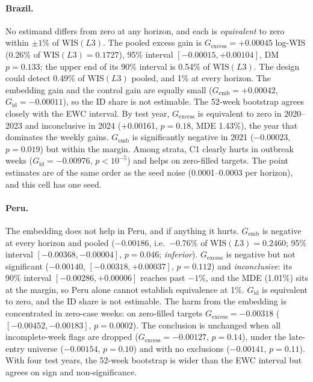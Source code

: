 \documentclass[11pt]{article}
\newcommand{\WIS}{\mathrm{WIS}}
\newcommand{\Gemb}{G_{\mathrm{emb}}}
\newcommand{\Gid}{G_{\mathrm{id}}}
\newcommand{\Gex}{G_{\mathrm{excess}}}
\begin{document}
\paragraph{Brazil.}
No estimand differs from zero at any horizon, and each is \emph{equivalent} to zero within $\pm1\%$ of
$\WIS(L3)$. The pooled excess gain is $\Gex=+0.00045$ log-WIS (0.26\% of $\WIS(L3)=0.1727$), 95\%
interval $[-0.00015, +0.00104]$, DM $p=0.133$; the upper end of its 90\% interval is 0.54\% of
$\WIS(L3)$. The design could detect 0.49\% of $\WIS(L3)$ pooled, and 1\% at every horizon. The embedding
gain and the control gain are equally small ($\Gemb=+0.00042$, $\Gid=-0.00011$), so the ID share is not
estimable. The 52-week bootstrap agrees closely with the EWC interval. By test year, $\Gex$ is equivalent
to zero in 2020--2023 and inconclusive in 2024 (+0.00161, $p=0.18$, MDE 1.43\%), the year that dominates
the weekly gains. $\Gemb$ is significantly negative in 2021 ($-0.00023$, $p=0.019$) but within the
margin. Among strata, C1 clearly hurts in outbreak weeks ($\Gid=-0.00976$, $p<10^{-5}$) and helps on
zero-filled targets. The point estimates are of the same order as the seed noise (0.0001--0.0003 per
horizon), and this cell has one seed.

\paragraph{Peru.}
The embedding does not help in Peru, and if anything it hurts. $\Gemb$ is negative at every horizon and
pooled ($-0.00186$, i.e.\ $-0.76\%$ of $\WIS(L3)=0.2460$; 95\% interval $[-0.00368,-0.00004]$, $p=0.046$;
\emph{inferior}). $\Gex$ is negative but not significant ($-0.00140$, $[-0.00318,+0.00037]$, $p=0.112$)
and \emph{inconclusive}: its 90\% interval $[-0.00286,+0.00006]$ reaches past $-1\%$, and the MDE (1.01\%)
sits at the margin, so Peru alone cannot establish equivalence at 1\%. $\Gid$ is equivalent to zero, and
the ID share is not estimable. The harm from the embedding is concentrated in zero-case weeks: on
zero-filled targets $\Gex=-0.00318$ ($[-0.00452,-0.00183]$, $p=0.0002$). The conclusion is unchanged
when all incomplete-week flags are dropped ($\Gex=-0.00127$, $p=0.14$), under the late-entry universe
($-0.00154$, $p=0.10$) and with no exclusions ($-0.00141$, $p=0.11$). With four test years, the 52-week
bootstrap is wider than the EWC interval but agrees on sign and non-significance.
\end{document}
